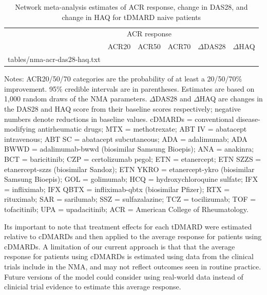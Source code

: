 \documentclass[11pt,final,fleqn]{article}
\makeatletter
\theoremstyle{plain}
\newcommand*\ExpandableInput[1]{\@@input#1 }
\makeatother
\begin{document}
\begin{table}
\begin{center}
\begin{threeparttable}
\caption{Network meta-analysis estimates of ACR response, change in DAS28, and change in HAQ for tDMARD naive patients} \label{tbl:nma-acr-das28-haq}
\small
\begin{tabular}{lccccc}
\hline
\multicolumn{1}{c}{} & \multicolumn{3}{c}{ACR response} & \multicolumn{2}{c}{}\\
\cmidrule(lr){2-4} 
\multicolumn{1}{l}{} & \multicolumn{1}{c}{ACR20} & \multicolumn{1}{c}{ACR50} & \multicolumn{1}{c}{ACR70} & \multicolumn{1}{c}{$\Delta$DAS28} & \multicolumn{1}{c}{$\Delta$HAQ} \\
\hline
\ExpandableInput{tables/nma-acr-das28-haq.txt}
\hline
\end{tabular}
\scriptsize
Notes: ACR20/50/70 categories are the probability of at least a 20/50/70\% improvement. 95\% credible intervals are in parentheses. Estimates are based on 1,000 random draws of the NMA parameters. $\Delta$DAS28 and $\Delta$HAQ are changes in the DAS28 and HAQ score from their baseline scores respectively; negative numbers denote reductions in baseline values. cDMARDs = conventional disease-modifying antirheumatic drugs; MTX = methotrexate; ABT IV = abatacept intravenous; ABT SC = abatacept subcutaneous; ADA = adalimumab; ADA BWWD = adalimumab-bwwd (biosimilar Samsung Bioepis); ANA = anakinra; BCT = baricitinib; CZP = certolizumab pegol; ETN = etanercept; ETN SZZS = etanercept-szzs (biosimilar Sandoz); ETN YKRO = etanercept-ykro (biosimilar Samsung Bioepis); GOL = golimumab; HCQ = hydroxychloroquine sulfate; IFX = infliximab; IFX QBTX = infliximab-qbtx (biosimilar Pfizer); RTX = rituximab; SAR = sarilumab; SSZ = sulfazalazine; TCZ = tocilizumab; TOF = tofacitinib; UPA = upadacitinib;  ACR = American College of Rheumatology.
\end{threeparttable}
\end{center}
\end{table}

Its important to note that treatment effects for each tDMARD were estimated relative to cDMARDs and then applied to the average response for patients using cDMARDs. A limitation of our current approach is that that the average response for patients using cDMARDs is estimated using data from the clinical trials include in the NMA, and may not reflect outcomes seen in routine practice. Future versions of the model could consider using real-world data instead of clinicial trial evidence to estimate this average response.
\end{document}
